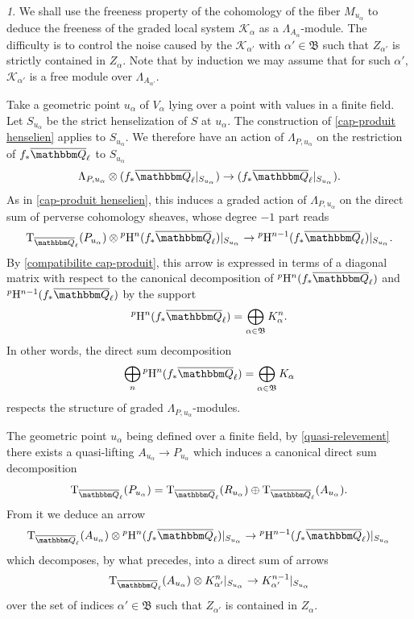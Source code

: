 \documentclass[12pt,english]{smfart}
\numberwithin{equation}{subsection}
\theoremstyle{remark}
\newtheorem{numero}[equation]{}
\newcommand\calK{{\mathcal K}}
\newcommand\rmT{{\rm T}}
\newcommand\FrakB{{\mathfrak B}}
\newcommand\QQ{{\mathbbm Q}}
\newcommand\rmH{{\rm H}}
\newcommand\Ql{{\overline\QQ_\ell}}
\begin{document}
\begin{numero}\label{action henselienne recurrence}
We shall use the freeness property of the cohomology of the fiber $M_{u_\alpha}$ to deduce the freeness of the graded local system $\calK_\alpha$ as a $\Lambda_{A_\alpha}$-module. The difficulty is to control the noise caused by the $\calK_{\alpha'}$ with $\alpha'\in\FrakB$ such that $Z_{\alpha'}$ is strictly contained in $Z_\alpha$. Note that by induction we may assume that for such $\alpha'$, $\calK_{\alpha'}$ is a free module over $\Lambda_{A_{\alpha'}}$.

Take a geometric point $u_\alpha$ of $V_\alpha$ lying over a point with values in a finite field. Let $S_{u_\alpha}$ be the strict henselization of $S$ at $u_\alpha$. The construction of \ref{cap-produit henselien} applies to $S_{u_\alpha}$. We therefore have an action of $\Lambda_{P,u_\alpha}$ on the restriction of $f_*\Ql$ to $S_{u_\alpha}$
\begin{equation}\label{action henselienne}
\Lambda_{P,u_\alpha}\otimes (f_*\Ql|_{S_{u_\alpha}}) \rightarrow (f_*\Ql|_{S_{u_\alpha}}).
\end{equation}
As in \ref{cap-produit henselien}, this induces a graded action of $\Lambda_{P,u_\alpha}$ on the direct sum of perverse cohomology sheaves, whose degree $-1$ part reads
$$\rmT_\Ql(P_{u_\alpha})\otimes {}^p\rmH^n(f_*\Ql)|_{S_{u_\alpha}} \rightarrow {}^p\rmH^{n-1}(f_*\Ql)|_{S_{u_\alpha}}.$$
By \ref{compatibilite cap-produit}, this arrow is expressed in terms of a diagonal matrix with respect to the canonical decomposition of ${}^p\rmH^n(f_*\Ql)$ and ${}^p\rmH^{n-1}(f_*\Ql)$ by the support
$${}^p\rmH^n(f_*\Ql)=\bigoplus_{\alpha\in\FrakB} K^n_\alpha.$$
In other words, the direct sum decomposition
$$\bigoplus_n {}^p\rmH^n(f_*\Ql)=\bigoplus_{\alpha\in\FrakB} K_\alpha$$
respects the structure of graded $\Lambda_{P,u_\alpha}$-modules.

The geometric point $u_\alpha$ being defined over a finite field, by \ref{quasi-relevement} there exists a quasi-lifting $A_{u_\alpha}\rightarrow P_{u_\alpha}$ which induces a canonical direct sum decomposition
$$\rmT_\Ql(P_{u_\alpha})=\rmT_\Ql(R_{u_\alpha})\oplus \rmT_\Ql(A_{u_\alpha}).$$
From it we deduce an arrow
$$\rmT_\Ql(A_{u_\alpha})\otimes {}^p\rmH^n(f_*\Ql)|_{S_{u_\alpha}} \rightarrow {}^p\rmH^{n-1}(f_*\Ql)|_{S_{u_\alpha}}$$
which decomposes, by what precedes, into a direct sum of arrows
$$\rmT_\Ql(A_{u_\alpha})\otimes K^n_{\alpha'}|_{S_{u_\alpha}} \rightarrow K^{n-1}_{\alpha'}|_{S_{u_\alpha}}$$
over the set of indices $\alpha'\in\FrakB$ such that $Z_{\alpha'}$ is contained in $Z_\alpha$.
\end{numero}
\end{document}

